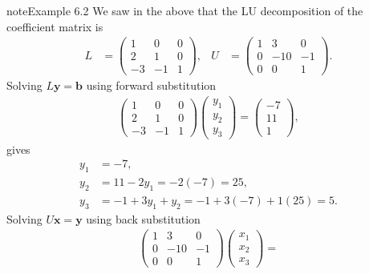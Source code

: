 \documentclass[letterpaper,10pt,english]{jupyterBook}
\begin{document}
\begin{sphinxadmonition}{note}{Example 6.2}
\sphinxAtStartPar
We saw in the {\hyperref[\detokenize{6_Direct_methods/6.1_LU_decomposition:lu-example}]{}} above that the LU decomposition of the coefficient matrix is
\begin{align*}
    L & =\begin{pmatrix}
        1 & 0 & 0 \\
        2 & 1 & 0 \\
        -3 & -1 & 1
    \end{pmatrix}, &
    U &= \begin{pmatrix}
        1 & 3 & 0 \\
        0 & -10 & -1 \\
        0 & 0 & 1
    \end{pmatrix}.
\end{align*}
\sphinxAtStartPar
Solving \(L \mathbf{y} = \mathbf{b}\) using forward substitution
\begin{align*}
    \begin{pmatrix}
        1 & 0 & 0 \\
        2 & 1 & 0 \\
        -3 & -1 & 1
    \end{pmatrix}
    \begin{pmatrix} y_1 \\ y_2 \\ y_3 \end{pmatrix} =
    \begin{pmatrix} -7\\ 11\\ 1
    \end{pmatrix},
\end{align*}
\sphinxAtStartPar
gives
\begin{align*}
    y_1 &=-7,\\
    y_2 &=11-2y_1 =-2(-7)=25,\\
    y_3 &=-1+3y_1 +y_2 =-1+3(-7)+1(25)=5.
\end{align*}
\sphinxAtStartPar
Solving \(U \mathbf{x} = \mathbf{y}\) using back substitution
\begin{align*}
    \begin{pmatrix}
        1 & 3 & 0\\
        0 & -10 & -1\\
        0 & 0 & 1
    \end{pmatrix}
    \begin{pmatrix} x_1 \\ x_2 \\ x_3 \end{pmatrix} =

\end{align*}
\end{sphinxadmonition}
\end{document}

